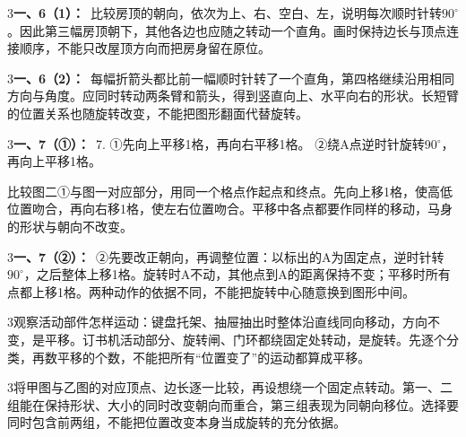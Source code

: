 \documentclass[multi=snippet,border={5bp 20bp 5bp 5bp}]{standalone}
\newenvironment{snippet}[3]{\begin{minipage}{#1bp}\color{answerred}\fontsize{#2}{#3}\selectfont\raggedright}{\end{minipage}}
\begin{document}
\begin{snippet}{505}{11.5}{14}\begin{multicols}{3}\raggedcolumns \textbf{一、6（1）：}\ 比较房顶的朝向，依次为上、右、空白、左，说明每次顺时针转\(90^\circ\)\allowbreak 。因此第三幅房顶朝下，其他各边也应随之转动一个直角。画时保持边长与顶点连接顺序，不能只改屋顶方向而把房身留在原位。\end{multicols}\end{snippet}
\begin{snippet}{505}{11.5}{14}\begin{multicols}{3}\raggedcolumns \textbf{一、6（2）：}\ 每幅折箭头都比前一幅顺时针转了一个直角，第四格继续沿用相同方向与角度。应同时转动两条臂和箭头，得到竖直向上、水平向右的形状。长短臂的位置关系也随旋转改变，不能把图形翻面代替旋转。\end{multicols}\end{snippet}
\begin{snippet}{505}{11.5}{14}\begin{multicols}{3}\raggedcolumns \textbf{一、7（①）：}\ 7. ①先向上平移1格，再向右平移1格。 ②绕A点逆时针旋转90\ensuremath{^\circ}，再向上平移1格。\par 比较图二①与图一对应部分，用同一个格点作起点和终点。先向上移1格，使高低位置吻合，再向右移1格，使左右位置吻合。平移中各点都要作同样的移动，马身的形状与朝向不改变。\end{multicols}\end{snippet}
\begin{snippet}{505}{11.5}{14}\begin{multicols}{3}\raggedcolumns \textbf{一、7（②）：}\ ②先要改正朝向，再调整位置：以标出的A为固定点，逆时针转\(90^\circ\)\allowbreak ，之后整体上移1格。旋转时A不动，其他点到A的距离保持不变；平移时所有点都上移1格。两种动作的依据不同，不能把旋转中心随意换到图形中间。\end{multicols}\end{snippet}
\begin{snippet}{505}{11.5}{14}\begin{multicols}{3}\raggedcolumns 观察活动部件怎样运动：键盘托架、抽屉抽出时整体沿直线同向移动，方向不变，是平移。订书机活动部分、旋转闸、门环都绕固定处转动，是旋转。先逐个分类，再数平移的个数，不能把所有“位置变了”的运动都算成平移。\end{multicols}\end{snippet}
\begin{snippet}{505}{11.5}{14}\begin{multicols}{3}\raggedcolumns 将甲图与乙图的对应顶点、边长逐一比较，再设想绕一个固定点转动。第一、二组能在保持形状、大小的同时改变朝向而重合，第三组表现为同朝向移位。选择要同时包含前两组，不能把位置改变本身当成旋转的充分依据。\end{multicols}\end{snippet}
\end{document}
